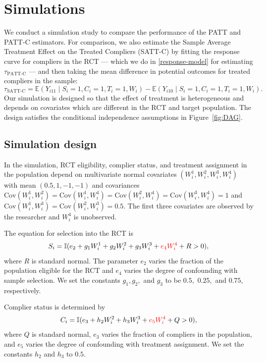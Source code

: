 \documentclass[hidelinks,12pt]{article}
\newcommand{\ind}{\mathbb{I}} %
\newcommand{\ex}{\mathbb{E}} %
\newcommand{\cov}{\mathrm{Cov}}
\begin{document}
{\section{Simulations} \label{sim}
\color{red}We conduct a simulation study to compare the performance of the PATT and PATT-C estimators. For comparison, we also estimate the Sample Average Treatment Effect on the Treated Compliers (SATT-C) by fitting the response curve for compliers in the RCT --- which we do in \ref{response-model} for estimating $\tau_{\text{PATT-C}}$ --- and then taking the mean difference in potential outcomes for treated compliers in the sample:
\begin{equation}\label{tsatt-est} 
\tau_{\text{SATT-C}} = \ex(Y_{i11} \mid S_i=1, C_i=1, T_i=1, W_i) - \ex(Y_{i10} \mid S_i=1, C_i=1, T_i=1, W_i).
\end{equation}
\color{black}
Our simulation is designed so that the effect of treatment is heterogeneous and depends on covariates which are different in the RCT and target population. The design satisfies the conditional independence assumptions in Figure~\ref{fig:DAG}.

\subsection{Simulation design}
{\color{red}In the simulation, RCT eligibility, complier status, and treatment assignment in the population depend on multivariate normal covariates $(W^{1}_i, W^{2}_i, W^{3}_i, W^{4}_i)$ with mean $(0.5, 1, -1, -1)$ and covariances $\cov(W^{1}_i, W^{2}_i) = \cov(W^{1}_i, W^{4}_i)= \cov(W^{2}_i, W^{4}_i) = \cov(W^{3}_i, W^{4}_i) = 1$ and $\cov(W^{1}_i, W^{3}_i) = \cov(W^{2}_i, W^{3}_i) = 0.5$.  The first three covariates are observed by the researcher and $W^{4}_i$ is unobserved. }

The  equation for selection into the RCT is
 \vskip 0.2in
 $$ S_i = \ind(e_2 + g_1W^{1}_i + g_2W^{2}_i + g_3W^{3}_i + {\color{red}e_4W^{4}_i} + R > 0),$$
 \vskip 0.2in
where $R$ is standard normal. The parameter $e_2$ varies the fraction of the population eligible for the RCT and {\color{red}$e_4$ varies the degree of confounding with sample selection.} We set the constants $g_1, g_2,$ and $g_3$ to be $0.5,$ $0.25,$ and $0.75$, respectively.

Complier status is determined by
\vskip 0.2in
$$C_i = \ind(e_3 + h_2W^{2}_i + h_3W^{3}_i + {\color{red}e_5W^{4}_i} + Q > 0),$$
\vskip 0.2in
where $Q$ is standard normal, $e_3$ varies the fraction of compliers in the population, and {\color{red}$e_5$ varies the degree of confounding with treatment assignment.} We set the constants $h_2$ and $h_3$ to $0.5$.

}
\end{document}
